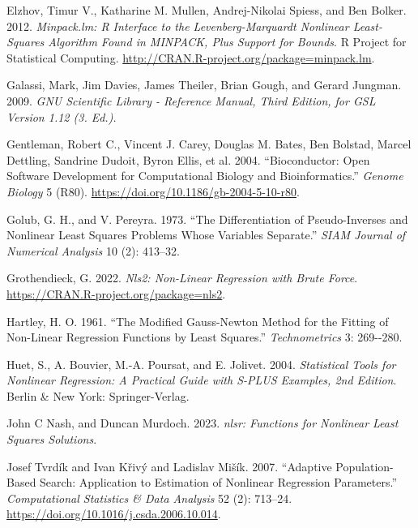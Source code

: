 \documentclass[
]{article}
\newlength{\cslhangindent}
\newlength{\cslentryspacingunit} %
\newenvironment{CSLReferences}[2] %
 {%
  \setlength{\parindent}{0pt}
  \ifodd #1
  \let\oldpar\par
  \def\par{\hangindent=\cslhangindent\oldpar}
  \fi
  \setlength{\parskip}{#2\cslentryspacingunit}
 }%
 {}
\begin{document}
\begin{CSLReferences}{1}{0}
\leavevmode{}%
Elzhov, Timur V., Katharine M. Mullen, Andrej-Nikolai Spiess, and Ben
Bolker. 2012. \emph{Minpack.lm: R Interface to the Levenberg-Marquardt
Nonlinear Least-Squares Algorithm Found in MINPACK, Plus Support for
Bounds}. R Project for Statistical Computing.
\url{http://CRAN.R-project.org/package=minpack.lm}.

\leavevmode{}%
Galassi, Mark, Jim Davies, James Theiler, Brian Gough, and Gerard
Jungman. 2009. \emph{GNU Scientific Library - Reference Manual, Third
Edition, for GSL Version 1.12 (3. Ed.).}

\leavevmode{}%
Gentleman, Robert C., Vincent J. Carey, Douglas M. Bates, Ben Bolstad,
Marcel Dettling, Sandrine Dudoit, Byron Ellis, et al. 2004.
{``Bioconductor: Open Software Development for Computational Biology and
Bioinformatics.''} \emph{{Genome Biology}} 5 (R80).
\url{https://doi.org/10.1186/gb-2004-5-10-r80}.

\leavevmode{}%
Golub, G. H., and V. Pereyra. 1973. {``The Differentiation of
Pseudo-Inverses and Nonlinear Least Squares Problems Whose Variables
Separate.''} \emph{SIAM Journal of Numerical Analysis} 10 (2): 413--32.

\leavevmode{}%
Grothendieck, G. 2022. \emph{Nls2: Non-Linear Regression with Brute
Force}. \url{https://CRAN.R-project.org/package=nls2}.

\leavevmode{}%
Hartley, H. O. 1961. {``The Modified Gauss-Newton Method for the Fitting
of Non-Linear Regression Functions by Least Squares.''}
\emph{Technometrics} 3: 269-\/-280.

\leavevmode{}%
Huet, S., A. Bouvier, M.-A. Poursat, and E. Jolivet. 2004.
\emph{Statistical Tools for Nonlinear Regression: A Practical Guide with
{S-PLUS} Examples, 2nd Edition}. Berlin \& New York: Springer-Verlag.

\leavevmode{}%
John C Nash, and Duncan Murdoch. 2023. \emph{{nlsr: Functions for
Nonlinear Least Squares Solutions}}.

\leavevmode{}%
Josef Tvrdík and Ivan Křivý and Ladislav Mišík. 2007. {``Adaptive
Population-Based Search: Application to Estimation of Nonlinear
Regression Parameters.''} \emph{{Computational Statistics \& Data
Analysis}} 52 (2): 713--24.
\url{https://doi.org/10.1016/j.csda.2006.10.014}.


\end{CSLReferences}
\end{document}
